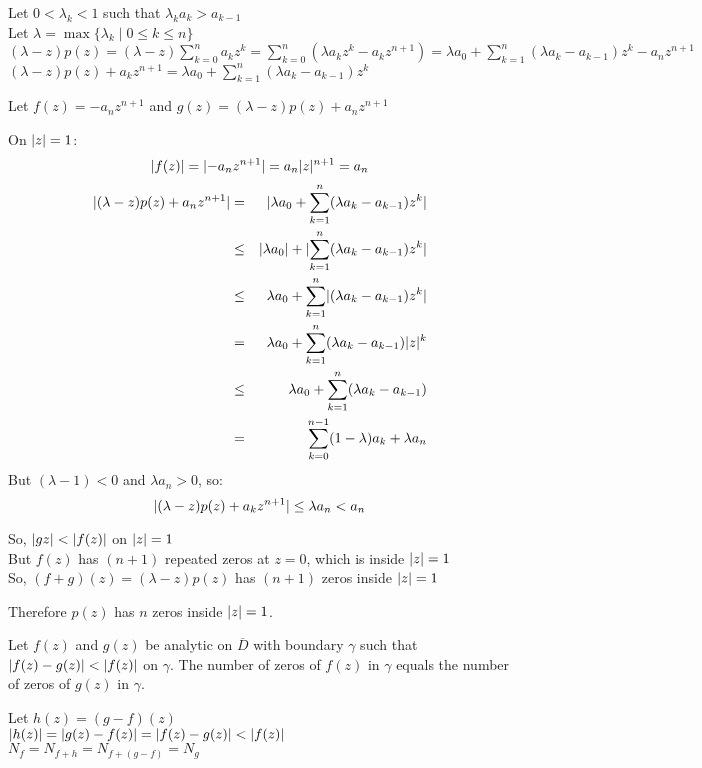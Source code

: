 \documentclass[letterpaper,12pt,fleqn]{article}
\newcommand{\g}{\gamma}
\renewcommand{\l}{\lambda}
\begin{document}
\begin{theproof}
  Let $0<\l_k<1$ such that $\l_ka_k>a_{k-1}$ \\
  Let $\l=\max\{\l_k\mid0\le k\le n\}$ \\
  $(\l-z)p(z)=(\l-z)\sum_{k=0}^na_kz^k=\sum_{k=0}^n(\l a_kz^k-a_kz^{n+1})=
  \l a_0+\sum_{k=1}^n(\l a_k-a_{k-1})z^k-a_nz^{n+1}$ \\
  $(\l-z)p(z)+a_kz^{n+1}=\l a_0+\sum_{k=1}^n(\l a_k-a_{k-1})z^k$

  Let $f(z)=-a_nz^{n+1}$ and $g(z)=(\l-z)p(z)+a_nz^{n+1}$

  On $\lvert z\rvert=1$:
  \[\lvert f(z)\rvert=\lvert-a_nz^{n+1}\rvert=a_n\lvert z\rvert^{n+1}=a_n\]
  \begin{eqnarray*}
    \abs{(\l-z)p(z)+a_nz^{n+1}} &=&
    \abs{\l a_0+\sum_{k=1}^n(\l a_k-a_{k-1})z^k}\\
    &\le& \abs{\l a_0}+\abs{\sum_{k=1}^n(\l a_k-a_{k-1})z^k} \\
    &\le& \l a_0+\sum_{k=1}^n\abs{(\l a_k-a_{k-1})z^k} \\
    &=& \l a_0+\sum_{k=1}^n(\l a_k-a_{k-1})\abs{z}^k \\
    &\le& \l a_0+\sum_{k=1}^n(\l a_k-a_{k-1}) \\
    &=& \sum_{k=0}^{n-1}(1-\l)a_k+\l a_n
  \end{eqnarray*}
  But $(\l-1)<0$ and $\l a_n>0$, so:
  \[\abs{(\l-z)p(z)+a_kz^{n+1}}\le\l a_n<a_n\]

  So, $\lvert g{z}\rvert<\lvert f(z)\rvert$ on $\lvert z\rvert=1$ \\
  But $f(z)$ has $(n+1)$ repeated zeros at $z=0$, which is inside
  $\lvert z\rvert=1$ \\
  So, $(f+g)(z)=(\l-z)p(z)$ has $(n+1)$ zeros inside $\lvert z\rvert=1$

  Therefore $p(z)$ has $n$ zeros inside $\lvert z\rvert=1$.
\end{theproof}

\begin{theorem}
  Let $f(z)$ and $g(z)$ be analytic on $\overline{D}$ with boundary $\g$ such
  that $\lvert f(z)-g(z)\rvert<\lvert f(z)\rvert$ on $\g$. The number of zeros of $f(z)$ in
  $\g$ equals the number of zeros of $g(z)$ in $\g$.
\end{theorem}

\begin{theproof}
  Let $h(z)=(g-f)(z)$ \\
  $\lvert h(z)\rvert=\lvert g(z)-f(z)\rvert=\lvert f(z)-g(z)\rvert<\lvert f(z)\rvert$ \\
  $N_f=N_{f+h}=N_{f+(g-f)}=N_g$
\end{theproof}
\end{document}
